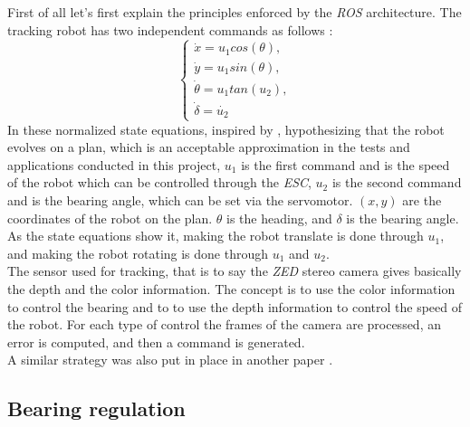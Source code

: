 		First of all let's first explain the principles enforced
		by the \textit{ROS} architecture. The tracking robot
		has two independent commands as follows :
		\[ \begin{cases}\label{key}
			\dot{x} = u_{1}cos(\theta),\\
			\dot{y} = u_{1}sin(\theta),\\
			\dot{\theta} = u_1tan(u_2),\\
			\dot{\delta} = \dot{u_{2}}	
		\end{cases} \]
		In these normalized state equations, inspired by \cite{model},
		hypothesizing that the robot evolves on a plan, which is 
		an acceptable approximation in the tests and applications conducted in this 
		project, $u_{1}$ is the first command and is the speed of the 
		robot which can be controlled through the \textit{ESC}, $u_{2}$
		is the second command and is the bearing angle, which 
		can be set via the servomotor. $(x,y)$ are
		the coordinates of the robot on the plan. $\theta$ is the heading, and 
		$\delta$ is the bearing angle. As the state equations show it, 
		making the robot translate is done through $u_1$, and making 
		the robot rotating is done through $u_1$ and $u_2$.
		\\\indent The sensor used for tracking, that is to say
		the \textit{ZED} stereo camera gives basically the depth and
		the color information. The concept is 
		to use the color information to control the bearing and to 
		to use the depth information to control the speed of the 
		robot. For each type of control the frames of the 
		camera are processed, an error is computed, and then 
		a command is generated.
		\\\indent A similar strategy was also put
		in place in another paper \cite{personfollowing}.
		
		
		\subsection{Bearing regulation}
			
